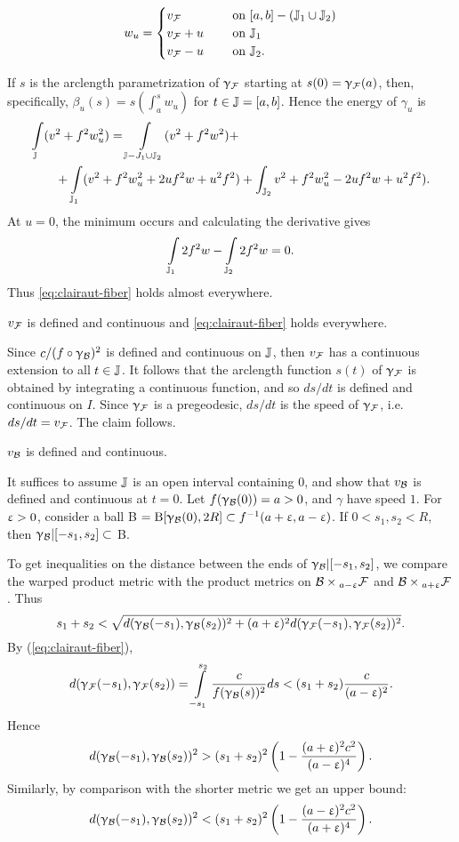 $$w_u =
\begin{cases}
v_\spc{F} \quad &\text{\ on\ } [a,b]- (\JJ_1\cup \JJ_2)\\
v_\spc{F}+u \quad &\text{\ on\ } \JJ_1\\
v_\spc{F}-u \quad &\text{\ on\ } \JJ_2.
\end{cases}
$$

If $s$ is the arclength parametrization of $\upgamma_{\mathcal{F}}$ starting at
$s(0) = \upgamma_{\mathcal{F}}(a)$, then, specifically, $\beta_u(s) = s(\int_a^s
w_u)$ for $t \in\JJ= [a,b]$. Hence the energy of $\gamma_u$ is
\begin{align*}
\int\limits_\JJ(v&^2+f^2w_u^2) 
= \int\limits_{\JJ -J_1\cup \JJ_2} (v^2+f^2w^2) +\\
&+\int\limits_{\JJ_1}(v^2+f^2w_u^2 + 2uf^2w + u^2f^2) +\int_{\JJ_2}v^2+f^2w_u^2 - 2uf^2w
+ u^2f^2).
\end{align*}
At $u=0$,  the minimum occurs and calculating the
derivative gives
$$\int\limits_{\mathbb{J}_1} 2f^2w - \int\limits_{\mathbb{J}_2} 2f^2w = 0.$$ 
Thus \ref{eq:clairaut-fiber} holds almost everywhere.  

\begin{clm}{}\label{clm:clairaut} $v_{\mathcal{F}}$ is defined and continuous and \ref{eq:clairaut-fiber} holds everywhere.
\end{clm}
Since $c/(f\circ \gamma_\spc{B})^{2}$ is defined and continuous on $\mathbb{J}$, then $v_ {\mathcal{F}}$ has a continuous extension to all $t\in \JJ$. It follows that the arclength function  $s(t)$ of   $\upgamma_{\mathcal{F}}$ is obtained by integrating a continuous function, and so $ds/dt$ is defined and continuous on $I$.  Since $\upgamma_{\mathcal{F}}$ is a pregeodesic, $ds/dt$ is the speed of $\upgamma_{\mathcal{F}}$, i.e. $ds/dt=v_{\mathcal{F}}$.  The claim follows.

\begin{clm}{}\label{clm:v_B} $v_{\mathcal{B}}$ is defined and continuous.
\end{clm}


It suffices to assume $\mathbb{J}$ is an open interval containing $0$, and show that $v_{\mathcal{B}}$ is defined and continuous at $t=0$. Let  $f(\upgamma_{\mathcal{B}}(0))=a>0$, and $\gamma$ have speed $1$.  For 
 $\upvarepsilon>0$, consider a ball B $=\oBall[\gamma_\spc{B}(0),2R]\subset f^{-1}(a+\eps,a-\eps)$.  If $0<s_1,s_2< R$, then $\gamma_\spc{B}|[-s_1,s_2]\subset$ B.
 

To get inequalities on the distance between the ends of $\upgamma_{\mathcal{B}}|[-s_1,s_2]$,
we compare the warped product metric with the  product metrics on
$\spc{B}\times_{a-\eps}\spc{F}$ and $\spc{B}\times_{a+\eps}\spc{F}$.  Thus 
$$s_1+s_2 < \sqrt{d(\upgamma_{\mathcal{B}}(-s_1),\upgamma_{\mathcal{B}}(s_2))^2
+ (a+\upvarepsilon)^2d(\upgamma_{\mathcal{F}}(-s_1),\upgamma_{\mathcal{F}}(s_2))^2}.$$
By (\ref{eq:clairaut-fiber}),
$$d(\upgamma_{\mathcal{F}}(-s_1),\upgamma_{\mathcal{F}}(s_2)) = 
\int\limits_{-s_1}^{s_2}\frac{c}{f(\upgamma_{\mathcal{B}}(s))^2}ds
< (s_1+s_2)\frac{c}{(a-\upvarepsilon)^2}.$$
Hence
$$d(\upgamma_{\mathcal{B}}(-s_1), \upgamma_{\mathcal{B}}(s_2))^2 >
(s_1+s_2)^2\left(1 -\frac{(a+\upvarepsilon)^2c^2}{(a-\upvarepsilon)^4}\right).$$
Similarly, by comparison with the shorter metric we get an upper bound:
$$d(\upgamma_{\mathcal{B}}(-s_1), \upgamma_{\mathcal{B}}(s_2))^2 <
(s_1+s_2)^2\left(1 -\frac{(a-\upvarepsilon)^2c^2}{(a+\upvarepsilon)^4}\right).$$

